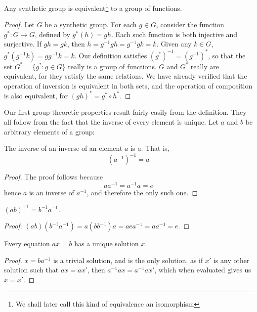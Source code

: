 \begin{theorem}
    Any synthetic group is equivalent\footnote{We shall later call this kind of equivalence an isomorphism} to a group of functions.
\end{theorem}
\begin{proof}
    Let $G$ be a synthetic group. For each $g \in G$, consider the function $g^*:G \to G$, defined by $g^*(h) = gh$. Each such function is both injective and surjective. If $gh = gk$, then $h = g^{-1}gh = g^{-1}gk = k$. Given any $k \in G$, $g^*(g^{-1}k) = gg^{-1}k = k$. Our definition satisfies $(g^*)^{-1} = (g^{-1})^*$, so that the set $G^* = \{ g^* : g \in G \}$ really is a group of functions. $G$ and $G^*$ really are equivalent, for they satisfy the same relations. We have already verified that the operation of inversion is equivalent in both sets, and the operation of composition is also equivalent, for $(gh)^* = g^* \circ h^*$.
\end{proof}

Our first group theoretic properties result fairly easily from the definition. They all follow from the fact that the inverse of every element is unique. Let $a$ and $b$ be arbitrary elements of a group:

\begin{lemma} The inverse of an inverse of an element $a$ is $a$. That is,
    \[ (a^{-1})^{-1} = a \]
\end{lemma}
\begin{proof}
    The proof follows because
    \[ a a^{-1} = a^{-1} a = e \]
    hence $a$ is an inverse of $a^{-1}$, and therefore the only such one.
\end{proof}

\begin{lemma} $(ab)^{-1} = b^{-1}a^{-1}$. \end{lemma}
\begin{proof} $(ab)(b^{-1}a^{-1}) = a(bb^{-1})a = aea^{-1} = aa^{-1} = e$. \end{proof}

\begin{lemma} Every equation $ax = b$ has a unique solution $x$. \end{lemma}
\begin{proof} $x = ba^{-1}$ is a trivial solution, and is the only solution, as if $x'$ is any other solution such that $ax = ax'$, then $a^{-1}ax = a^{-1}ax'$, which when evaluated gives us $x = x'$.
\end{proof}

